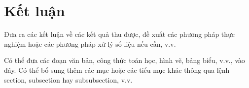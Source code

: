 \chapter*{Kết luận}
\label{ch:ketluan}

Đưa ra các kết luận về các kết quả thu được, đề xuất các phương pháp thực nghiệm hoặc các phương pháp xử lý số liệu nếu cần, v.v.

Có thể đưa các đoạn văn bản, công thức toán học, hình vẽ, bảng biểu, v.v., vào đây. Có thể bổ sung thêm các mục hoặc các tiểu mục khác thông qua lệnh section, subsection hay subsubsection, v.v.